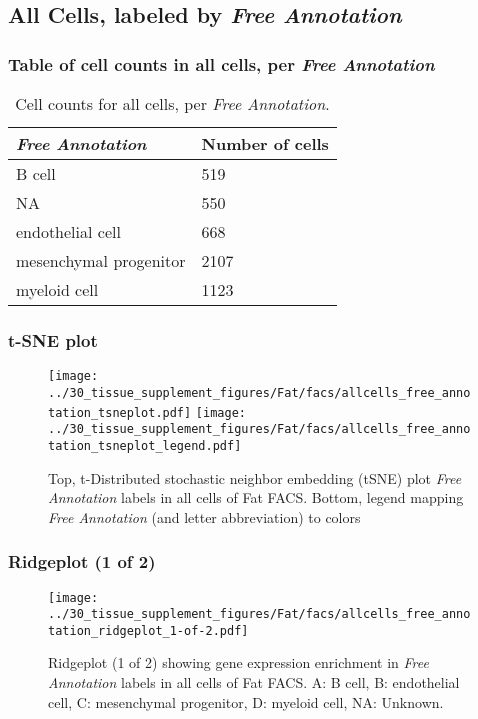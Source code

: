 \clearpage

\subsection{All Cells, labeled by \emph{Free Annotation}}
\subsubsection{Table of cell counts in all cells, per \emph{Free Annotation}}\begin{table}[h]
\centering
\label{my-label}
\begin{tabular}{@{}ll@{}}
\toprule

\emph{Free Annotation}& Number of cells \\ \midrule
B cell & 519 \\

NA & 550 \\

endothelial cell & 668 \\

mesenchymal progenitor & 2107 \\

myeloid cell & 1123 \\
\bottomrule
\end{tabular}
\caption{Cell counts for all cells, per \emph{Free Annotation}.}
\end{table}

\clearpage
\subsubsection{t-SNE plot}
\begin{figure}[h]
\centering
\texttt{[image: ../30\_tissue\_supplement\_figures/Fat/facs/allcells\_free\_annotation\_tsneplot.pdf]}
\texttt{[image: ../30\_tissue\_supplement\_figures/Fat/facs/allcells\_free\_annotation\_tsneplot\_legend.pdf]}
\caption{Top, t-Distributed stochastic neighbor embedding (tSNE) plot  \emph{Free Annotation} labels in all cells of Fat FACS. Bottom, legend mapping \emph{Free Annotation} (and letter abbreviation) to colors}
\end{figure}


\clearpage

\subsubsection{Ridgeplot (1 of 2)}
\begin{figure}[h]
\centering
\texttt{[image: ../30\_tissue\_supplement\_figures/Fat/facs/allcells\_free\_annotation\_ridgeplot\_1-of-2.pdf]}

\caption{ Ridgeplot (1 of 2)  showing gene expression enrichment in \emph{Free Annotation} labels in all cells of Fat FACS. A: B cell, B: endothelial cell, C: mesenchymal progenitor, D: myeloid cell, NA: Unknown.}
\end{figure}


